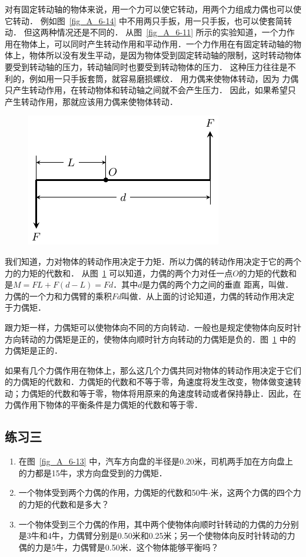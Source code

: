 对有固定转动轴的物体来说，用一个力可以使它转动，用两个力组成力偶也可以使它转动．
例如图~\ref{fig_A_6-14} 中不用两只手扳，用一只手扳，也可以使套简转动．
但这两种情况还是不同的．
从图~\ref{fig_A_6-11} 所示的实验知道，一个力作用在物体上，可以同时产生转动作用和平动作用．一个力作用在有固定转动轴的物体上，物体所以没有发生平动，是因为物体受到固定转动轴的限制，这时转动物体要受到转动轴的压力，转动轴同时也要受到转动物体的压力．
这种压力往往是不利的，例如用一只手扳套筒，就容易磨损螺纹．
用力偶来使物体转动，因为
力偶只产生转动作用，在转动物体和转动轴之间就不会产生压力．
因此，如果希望只产生转动作用，那就应该用力偶来使物体转动．
\begin{figure}[htbp]
    \centering
    \includegraphics{fig/A/6-15.pdf}
    \caption{}\label{fig_A_6-15}
\end{figure}

我们知道，力对物体的转动作用决定于力矩．所以力偶的转动作用决定于它的两个力的力矩的代数和．
从图~\ref{fig_A_6-15} 可以知道，力偶的两个力对任一点$O$的力矩的代数和是$M=FL+F(d-L)=Fd$．其中$d$是力偶的两个力之间的垂直
距离，叫做．力偶的一个力和力偶臂的乘积$Fd$叫做．从上面的讨论知道，力偶的转动作用决定于力偶矩．

跟力矩一样，力偶矩可以使物体向不同的方向转动．一般也是规定使物体向反时针方向转动的力偶矩是正的，使物体向顺时针方向转动的力偶矩是负的．图~\ref{fig_A_6-15} 中的力偶矩是正的．




如果有几个力偶作用在物体上，那么这几个力偶共同对物体的转动作用决定于它们的力偶矩的代数和．力偶矩的代数和不等于零，角速度将发生改变，物体做变速转动；力偶矩的代数和等于零，物体将用原来的角速度转动或者保持静止．因此，在力偶作用下物体的平衡条件是力偶矩的代数和等于零．

\subsection*{练习三}
\begin{enumerate}
    \item 在图~\ref{fig_A_6-13} 中，汽车方向盘的半径是0.20米，司机两手加在方向盘上的力都是15牛，求方向盘受到的力偶矩．
    \item 一个物体受到两个力偶的作用，力偶矩的代数和50牛$\cdot$米，这两个力偶的四个力的力矩的代数和是多大？
    \item 一个物体受到三个力偶的作用，其中两个使物体向顺时针转动的力偶的力分别是3牛和4牛，力偶臂分别是0.50米和0.25米；另一个使物体向反时针转动的力偶的力是5牛，力偶臂是0.50米．这个物体能够平衡吗？
\end{enumerate}

